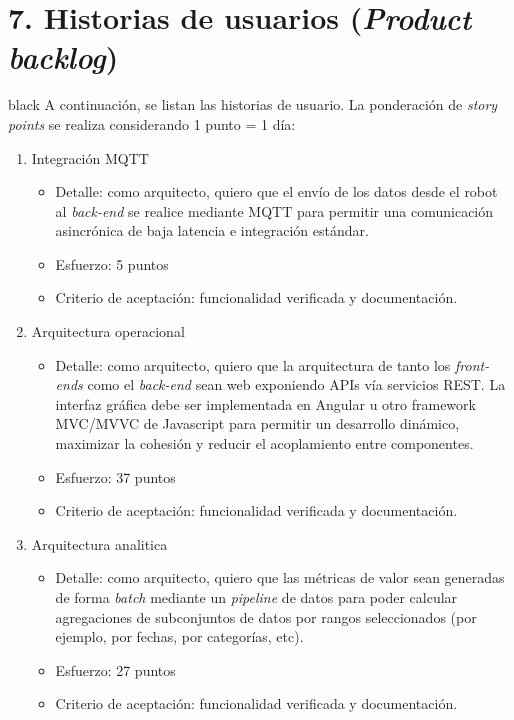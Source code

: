 \documentclass[
11pt, %
]{charter}
\begin{document}
\section{7. Historias de usuarios (\textit{Product backlog})}
\label{sec:backlog}

\begin{consigna}{black}
A continuación, se listan las historias de usuario. La ponderación de \textit{story points} se realiza considerando 1 punto = 1 día:


\begin{enumerate}

	\item Integración MQTT
	\begin{itemize}
		\item Detalle: como arquitecto, quiero que el envío de los datos desde el robot al \textit{back-end} se realice mediante MQTT para permitir una comunicación asincrónica de baja latencia e integración estándar.
		\item Esfuerzo: 5 puntos
		\item Criterio de aceptación: funcionalidad verificada y documentación.
	\end{itemize}


	\item Arquitectura operacional
	\begin{itemize}
		\item Detalle: como arquitecto, quiero que la arquitectura de tanto los \textit{front-ends} como el \textit{back-end} sean web exponiendo APIs vía servicios REST. La interfaz gráfica debe ser implementada en Angular u otro framework MVC/MVVC de Javascript para permitir un desarrollo dinámico, maximizar la cohesión y reducir el acoplamiento entre componentes.
		\item Esfuerzo: 37 puntos
		\item Criterio de aceptación: funcionalidad verificada y documentación.
	\end{itemize}

	\item Arquitectura analitica
	\begin{itemize}
		\item Detalle: como arquitecto, quiero que las métricas de valor sean generadas de forma \textit{batch} mediante un \textit{pipeline} de datos para poder calcular agregaciones de subconjuntos de datos por rangos seleccionados (por ejemplo, por fechas, por categorías, etc).
		\item Esfuerzo: 27 puntos
		\item Criterio de aceptación: funcionalidad verificada y documentación.
	\end{itemize}


\end{enumerate}
\end{consigna}
\end{document}
